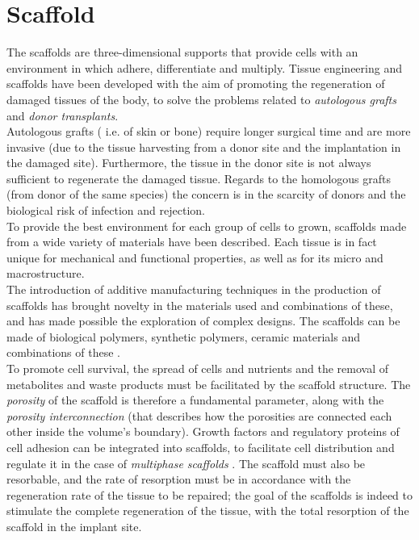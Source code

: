 
\chapter{Scaffold} %

\label{Chapter7} %

 
The scaffolds are three-dimensional supports that provide cells with an environment in which adhere, differentiate and multiply. Tissue engineering and scaffolds have been developed with the aim of promoting the regeneration of damaged tissues of the body, to solve the problems related to \emph{autologous grafts} and \emph{donor transplants}. \\ Autologous grafts ( i.e. of skin or bone) require longer surgical time and are more invasive (due to the tissue harvesting from a donor site and the implantation in the damaged site). Furthermore, the tissue in the donor site is not always sufficient to regenerate the damaged tissue. Regards to the homologous grafts (from donor of the same species) the concern is in the scarcity of donors and the biological risk of infection and rejection. \\
To provide the best environment for each group of cells to grown, scaffolds made from a wide variety of materials have been described. Each tissue is in fact unique for mechanical and functional properties, as well as for its micro and macrostructure. \\ The introduction of additive manufacturing techniques in the production of scaffolds has brought novelty in the materials used and combinations of these, and has made possible the exploration of complex designs. The scaffolds can be made of biological polymers, synthetic polymers, ceramic materials and combinations of these \parencites{Reference128}. \\
To promote cell survival, the spread of cells and nutrients and the removal of metabolites and waste products must be facilitated by the scaffold structure. The \emph{porosity} of the scaffold is therefore a fundamental parameter, along with the \emph{porosity interconnection} (that describes how the porosities are connected each other inside the volume's boundary). Growth factors and regulatory proteins of cell adhesion can be integrated into scaffolds, to facilitate cell distribution and regulate it in the case of \emph{multiphase scaffolds} \parencite{Reference129}. The scaffold must also be resorbable, and the rate of resorption must be in accordance with the regeneration rate of the tissue to be repaired; the goal of the scaffolds is indeed to stimulate the complete regeneration of the tissue, with the total resorption of the scaffold in the implant site. \\

